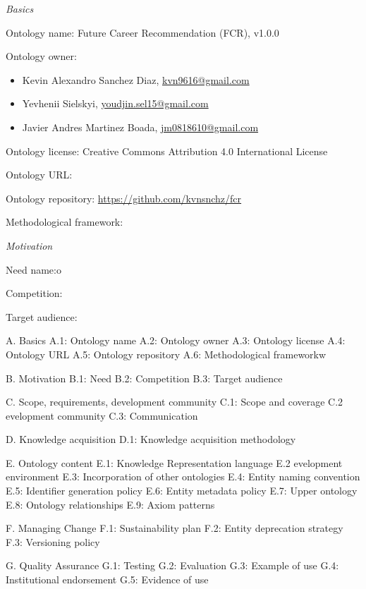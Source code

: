 \documentclass[english]{article}
\begin{document}
\begin{labelist}
    \item 
        \textit{Basics}
        \begin{labelist}
            \item Ontology name: Future Career Recommendation (FCR), v1.0.0
            \item Ontology owner:
                \begin{itemize}
                    \item Kevin Alexandro Sanchez Diaz, \href{mailto:kvn9616@gmail.com}{kvn9616@gmail.com}
                    \item Yevhenii Sielskyi, \href{mailto:youdjin.sel15@gmail.com}{youdjin.sel15@gmail.com}
                    \item Javier Andres Martinez Boada, \href{mailto:jm0818610@gmail.com}{jm0818610@gmail.com}
                \end{itemize}
            \item Ontology license: Creative Commons Attribution 4.0 International License
            \item Ontology URL: 
            \item Ontology repository: \href{https://github.com/kvnsnchz/fcr}{https://github.com/kvnsnchz/fcr}
            \item Methodological framework:
        \end{labelist}
    \item 
        \textit{Motivation}
        \begin{labelist}
            \item Need name:o
            \item Competition:
            \item Target audience:
        \end{labelist}
\end{labelist}

\par A. Basics
A.1: Ontology name     
A.2: Ontology owner     
A.3: Ontology license 
A.4: Ontology URL 
A.5: Ontology repository
A.6: Methodological frameworkw 
\par B. Motivation
B.1: Need 
B.2: Competition 
B.3: Target audience 
\par C. Scope, requirements, development community
C.1: Scope and coverage 
C.2 evelopment community 
C.3: Communication 
\par D. Knowledge acquisition
D.1: Knowledge acquisition methodology 
\par E. Ontology content
E.1: Knowledge Representation language 
E.2 evelopment environment 
E.3: Incorporation of other ontologies 
E.4: Entity naming convention 
E.5: Identifier generation policy 
E.6: Entity metadata policy 
E.7: Upper ontology 
E.8: Ontology relationships 
E.9: Axiom patterns 
\par F. Managing Change
F.1: Sustainability plan 
F.2: Entity deprecation strategy 
F.3: Versioning policy 
\par G. Quality Assurance
G.1: Testing 
G.2: Evaluation 
G.3: Example of use 
G.4: Institutional endorsement 
G.5: Evidence of use 
\end{document}
